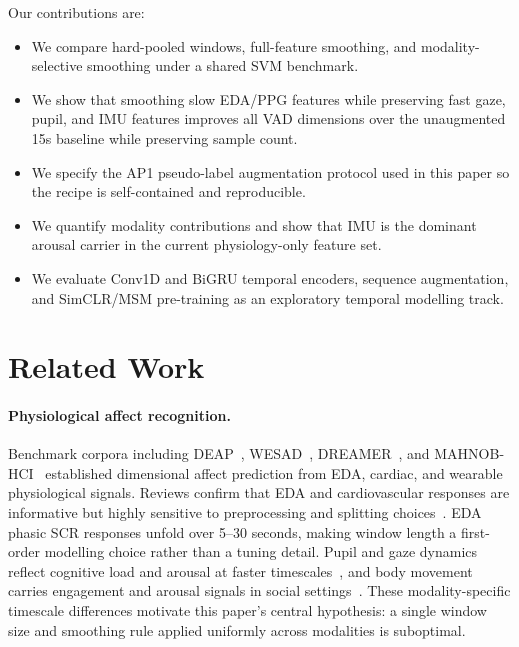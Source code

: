 \documentclass[sigconf,review,anonymous]{acmart}
\begin{document}
Our contributions are:
\begin{itemize}[leftmargin=1.2em,itemsep=1pt,topsep=2pt]
  \item We compare hard-pooled windows, full-feature smoothing, and
  modality-selective smoothing under a shared SVM benchmark.
  \item We show that smoothing slow EDA/PPG features while preserving fast
  gaze, pupil, and IMU features improves all VAD dimensions over the
  unaugmented 15s baseline while preserving sample count.
  \item We specify the AP1 pseudo-label augmentation protocol used in this
  paper so the recipe is self-contained and reproducible.
  \item We quantify modality contributions and show that IMU is the dominant
  arousal carrier in the current physiology-only feature set.
  \item We evaluate Conv1D and BiGRU temporal encoders, sequence augmentation,
  and SimCLR/MSM pre-training as an exploratory temporal modelling track.
\end{itemize}

\section{Related Work}
\label{sec:related}

\paragraph{Physiological affect recognition.}
Benchmark corpora including DEAP~\cite{koelstra2012deap},
WESAD~\cite{schmidt2018wesad}, DREAMER~\cite{katsigiannis2018dreamer}, and
MAHNOB-HCI~\cite{soleymani2012mahnob} established dimensional affect prediction
from EDA, cardiac, and wearable physiological signals.
Reviews confirm that EDA and cardiovascular responses are informative but
highly sensitive to preprocessing and splitting
choices~\cite{shu2018review,ahmad2022survey,kreibig2010autonomic}.
EDA phasic SCR responses unfold over 5--30 seconds, making window length a
first-order modelling choice rather than a tuning detail.
Pupil and gaze dynamics reflect cognitive load and arousal at faster
timescales~\cite{partala2003pupil,laeng2012pupillometry},
and body movement carries engagement and arousal signals in social
settings~\cite{karg2013body}.
These modality-specific timescale differences motivate this paper's central
hypothesis: a single window size and smoothing rule applied uniformly across
modalities is suboptimal.
\end{document}
